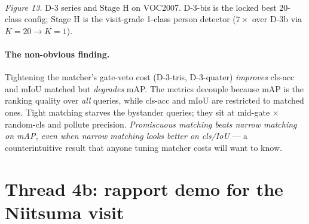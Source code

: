\documentclass[11pt,a4paper]{article}
\theoremstyle{plain}
\theoremstyle{definition}
\begin{document}
\begin{center}
\\[2pt]
\small\textit{Figure 13.} D-3 series and Stage H on VOC2007. D-3-bis is
the locked best 20-class config; Stage H is the visit-grade
1-class person detector ($7\times$ over D-3b via $K{=}20 \to K{=}1$).
\end{center}

\paragraph{The non-obvious finding.} Tightening the matcher's
gate-veto cost (D-3-tris, D-3-quater) \emph{improves} cls-acc and
mIoU matched but \emph{degrades} mAP. The metrics decouple because
mAP is the ranking quality over \emph{all} queries, while cls-acc
and mIoU are restricted to matched ones. Tight matching starves
the bystander queries; they sit at mid-gate $\times$ random-cls and
pollute precision. \emph{Promiscuous matching beats narrow matching
on mAP, even when narrow matching looks better on cls/IoU} — a
counterintuitive result that anyone tuning matcher costs will want
to know.

\section{Thread 4b: rapport demo for the Niitsuma visit}
\end{document}
